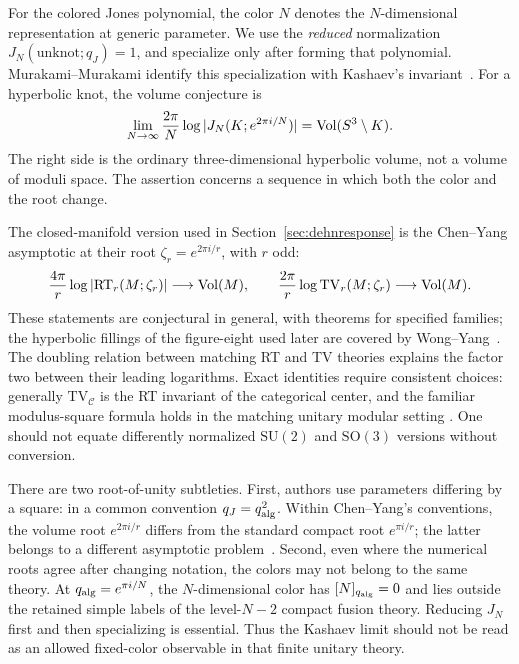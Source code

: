For the colored Jones polynomial, the color $N$ denotes the
$N$-dimensional representation at generic parameter. We use the
\emph{reduced} normalization $J_N(\text{unknot};q_J)=1$, and specialize
only after forming that polynomial. Murakami--Murakami identify this
specialization with Kashaev's invariant~\cite{MurakamiMurakami}.
For a hyperbolic knot, the volume conjecture is
\begin{equation}
 \lim_{N\to\infty}\frac{2\pi}{N}
 \log|J_N(K;e^{2\pi i/N})|=\operatorname{Vol}(S^3\setminus K).
 \label{eq:introknotvolume}
\end{equation}
The right side is the ordinary three-dimensional hyperbolic volume,
not a volume of moduli space. The assertion concerns a sequence in
which both the color and the root change.

The closed-manifold version used in Section~\ref{sec:dehnresponse}
is the Chen--Yang asymptotic at their root $\zeta_r=e^{2\pi i/r}$,
with $r$ odd:
\begin{equation}
 \frac{4\pi}{r}\log|\mathrm{RT}_r(M;\zeta_r)|\longrightarrow\operatorname{Vol}(M),
 \qquad
 \frac{2\pi}{r}\log\mathrm{TV}_r(M;\zeta_r)\longrightarrow\operatorname{Vol}(M).
 \label{eq:introclosedvolume}
\end{equation}
These statements are conjectural in general, with theorems for
specified families; the hyperbolic fillings of the figure-eight used
later are covered by Wong--Yang~\cite{WongYangDehn}. The doubling
relation between matching RT and TV theories explains the factor
two between their leading logarithms. Exact identities require
consistent choices: generally $\mathrm{TV}_{\mathcal C}$ is the RT
invariant of the categorical center, and the familiar modulus-square
formula holds in the matching unitary modular setting
\cite{TuraevVirelizier}. One should not equate differently normalized
$\mathrm{SU}(2)$ and $\mathrm{SO}(3)$ versions without conversion.

There are two root-of-unity subtleties. First, authors use parameters
differing by a square: in a common convention $q_J=q_{\rm alg}^2$.
Within Chen--Yang's conventions, the volume root $e^{2\pi i/r}$
differs from the standard compact root $e^{\pi i/r}$; the latter
belongs to a different asymptotic problem~\cite{ChenYang}.
Second, even where the numerical roots agree after changing notation,
the colors may not belong to the same theory. At
$q_{\rm alg}=e^{\pi i/N}$, the $N$-dimensional color has
$[N]_{q_{\rm alg}}=0$ and lies outside the retained simple labels
of the level-$N-2$ compact fusion theory. Reducing $J_N$ first and
then specializing is essential. Thus the Kashaev limit should not
be read as an allowed fixed-color observable in that finite unitary
theory.

